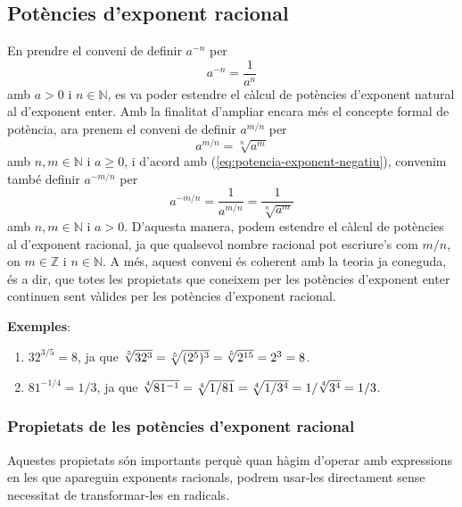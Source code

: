 \subsection{Potències d’exponent racional}

En prendre el conveni de definir $a^{-n}$ per%
\begin{equation}
a^{-n}=\frac{1}{a^{n}}  \label{eq:potencia-exponent-negatiu}
\end{equation}%
amb $a>0$ i $n\in \mathbb{N}$, es va poder estendre el càlcul de potències
d’exponent natural al d’exponent enter. Amb la finalitat d’ampliar encara més el concepte formal de potència, ara prenem el conveni de definir $%
a^{m/n}$ per%
\begin{equation*}
a^{m/n}=\sqrt[n]{a^{m}}
\end{equation*}%
amb $n,m\in \mathbb{N}$ i $a\geq 0$, i d’acord amb (\ref{eq:potencia-exponent-negatiu}), convenim també definir $a^{-m/n}$ per%
\begin{equation*}
a^{-m/n}=\frac{1}{a^{m/n}}=\frac{1}{\sqrt[n]{a^{m}}}
\end{equation*}%
amb $n,m\in \mathbb{N}$ i $a>0$. D’aquesta manera, podem estendre el càlcul de potències al d’exponent racional, ja que qualsevol nombre
racional pot escriure’s com $m/n$, on $m\in \mathbb{Z}$ i $n\in 
\mathbb{N}$. A més, aquest conveni és coherent amb la teoria ja
coneguda, és a dir, que totes les propietats que coneixem per les
potències d’exponent enter continuen sent vàlides per les
potències d’exponent racional.

\textbf{Exemples}:

\begin{enumerate}
\item $32^{3/5}=8$, ja que $\sqrt[5]{32^{3}}=\sqrt[5]{(2^{5})^{3}}=\sqrt[5]{%
2^{15}}=2^{3}=8$.

\item $81^{-1/4}=1/3$, ja que $\sqrt[4]{81^{-1}}=\sqrt[4]{1/81}=\sqrt[4]{%
1/3^{4}}=1/\sqrt[4]{3^{4}}=1/3$.
\end{enumerate}

\subsubsection{Propietats de les potències d’exponent racional}

Aquestes propietats són importants perquè quan hàgim d’operar amb
expressions en les que apareguin exponents racionals, podrem usar-les
directament sense necessitat de transformar-les en radicals.


